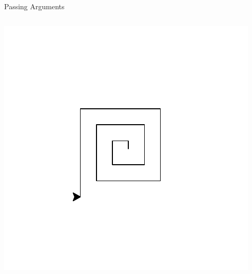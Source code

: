\begin{frame}{Passing Arguments}

    \vspace{-1em}

    \begin{columns}[totalwidth = \textwidth]

    \begin{column}{0.5\textwidth}

        \includegraphics[width = \textwidth]{03_Control_Structures/spiral3}

    \end{column}

    \begin{column}{0.5\textwidth}


\end{column}
\end{columns}
\end{frame}
